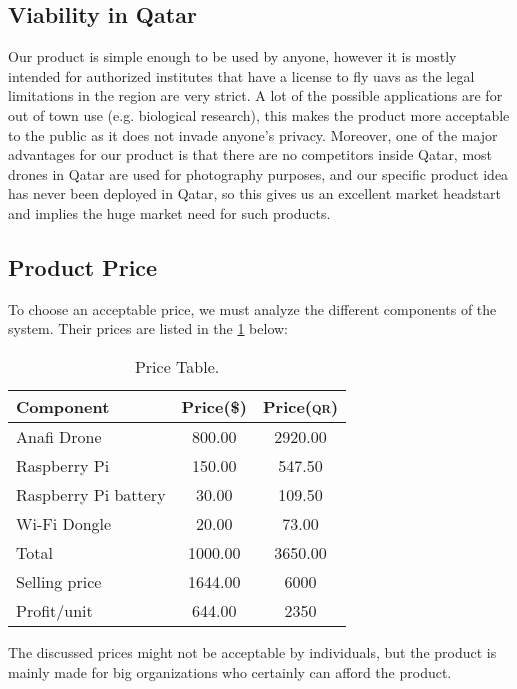 \documentclass[../main.tex]{subfiles}
\begin{document}
\subsection{Viability in Qatar}
	Our product is simple enough to be used by anyone, however it is mostly intended for 
	authorized institutes that have a license to fly \glspl{uav} as the legal limitations 
	in the region are very strict. 
	A lot of the possible applications are for out of town use (e.g. biological research), 
	this makes the product more acceptable to the public as it does not invade anyone's privacy.
	Moreover, one of the major advantages for our product is that there are no competitors 
	inside Qatar, most drones in Qatar are used for photography purposes, and our
	specific product idea has never been deployed in Qatar, so this gives us an excellent 
	market headstart and implies the huge market need for such products.
\subsection{Product Price}
To choose an acceptable price, we must analyze the different components of the system. Their prices are listed in the \cref{tab:components-prices} below:
	\\
	\begin{table}[H]
		\begin{center}
			\caption{Price Table.}
			\label{tab:components-prices}
			\begin{tabular}{p{3.5cm} c c} 
                            \toprule
                            \textbf{Component} & \textbf{Price(\$)} & \textbf{Price(\textsc{qr})}\\
				\midrule
				Anafi Drone & 800.00 & 2920.00 \\
				Raspberry Pi & 150.00 & 547.50 \\
				Raspberry Pi battery & 30.00 & 109.50\\
				Wi-Fi Dongle & 20.00 & 73.00\\
				\hline 
				Total & 1000.00 & 3650.00 \\
				Selling price & 1644.00 & 6000 \\ 
				Profit/unit & 644.00 & 2350 \\
				\bottomrule
			\end{tabular}
		\end{center}
	\end{table}

	The discussed prices might not be acceptable by individuals, but the product is mainly made for big organizations who certainly can afford the product.
	
\end{document}
